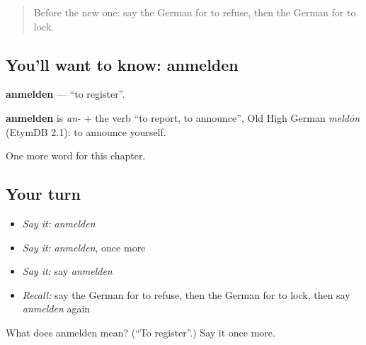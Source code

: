\begin{quote}
Before the new one: say the German for to refuse, then the German for to lock.
\end{quote}

\subsection*{You'll want to know: anmelden}
\textbf{anmelden} — \textquotedblleft{}to register\textquotedblright{}.

\begin{cousinweb}
\textbf{anmelden} is \emph{an-} + the verb \textquotedblleft{}to report, to announce\textquotedblright{}, Old High German \emph{meldōn} (EtymDB 2.1): to announce yourself.
\end{cousinweb}

\begin{grammarlens}[title={What you've built}]
One more word for this chapter.
\end{grammarlens}

\subsection*{Your turn}
\begin{itemize}
\raggedright
  \item \emph{Say it:} \emph{anmelden}
  \item \emph{Say it:} \emph{anmelden}, once more
  \item \emph{Say it:} say \emph{anmelden}
  \item \emph{Recall:} say the German for to refuse, then the German for to lock, then say \emph{anmelden} again
\end{itemize}

\begin{tcolorbox}[breakable,colback=teal!4,colframe=teal!35!black,title={Before you move on}]
What does anmelden mean? (\textquotedblleft{}To register\textquotedblright{}.) Say it once more.
\end{tcolorbox}
